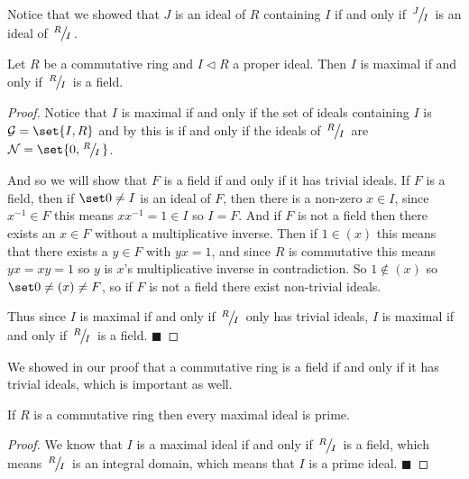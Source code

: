 \documentclass[10pt]{article}
\let\pideal=\triangleleft
\def\qed{\hskip1cm\hbox{}\hfill$\blacksquare$}
\def\mN{\mathcal N}
\def\mG{\mathcal G}
\begin{document}
Notice that we showed that $J$ is an ideal of $R$ containing $I$ if and only if $\slfrac JI$ is an ideal of $\slfrac RI$.

\begin{prop*}

    Let $R$ be a commutative ring and $I\pideal R$ a proper ideal.
    Then $I$ is maximal if and only if $\slfrac RI$ is a field.

\end{prop*}

\begin{proof}

    Notice that $I$ is maximal if and only if the set of ideals containing $I$ is $\mG=\set{I, R}$ and by  this is if and only if the ideals of $\slfrac RI$ are
    $\mN=\set{0, \slfrac RI}$.

    And so we will show that $F$ is a field if and only if it has trivial ideals.
    If $F$ is a field, then if $\set0\neq I$ is an ideal of $F$, then there is a non-zero $x\in I$, since $x^{-1}\in F$ this means $xx^{-1}=1\in I$ so $I=F$.
    And if $F$ is not a field then there exists an $x\in F$ without a multiplicative inverse.
    Then if $1\in(x)$ this means that there exists a $y\in F$ with $yx=1$, and since $R$ is commutative this means $yx=xy=1$ so $y$ is $x$'s multiplicative inverse in contradiction.
    So $1\notin(x)$ so $\set0\neq(x)\neq F$, so if $F$ is not a field there exist non-trivial ideals.

    Thus since $I$ is maximal if and only if $\slfrac RI$ only has trivial ideals, $I$ is maximal if and only if $\slfrac RI$ is a field.
    \qed

\end{proof}

We showed in our proof that a commutative ring is a field if and only if it has trivial ideals, which is important as well.

\begin{coro*}

    If $R$ is a commutative ring then every maximal ideal is prime.

\end{coro*}

\begin{proof}

    We know that $I$ is a maximal ideal if and only if $\slfrac RI$ is a field, which means $\slfrac RI$ is an integral domain, which means that $I$ is a prime ideal.
    \qed

\end{proof}
\end{document}
